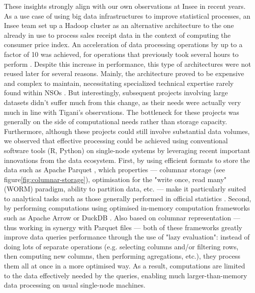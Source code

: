 These insights strongly align with our own observations at Insee in recent years. As a use case of using big data infrastructures to improve statistical processes, an Insee team set up a Hadoop cluster as an alternative architecture to the one already in use to process sales receipt data in the context of computing the consumer price index. An acceleration of data processing operations by up to a factor of 10 was achieved, for operations that previously took several hours to perform \cite{leclair2019utiliser}. Despite this increase in performance, this type of architectures were not reused later for several reasons. Mainly, the architecture proved to be expensive and complex to maintain, necessitating specialized technical expertise rarely found within NSOs \cite{vale2015international}. But interestingly, subsequent projects involving large datasets didn't suffer much from this change, as their needs were actually very much in line with Tigani's observations. The bottleneck for these projects was generally on the side of computational needs rather than storage capacity. Furthermore, although these projects could still involve substantial data volumes, we observed that effective processing could be achieved using conventional software tools (R, Python) on single-node systems by leveraging recent important innovations from the data ecosystem. First, by using efficient formats to store the data such as Apache Parquet \cite{parquet2013}, which properties — columnar storage \cite{abadi2013design} (see figure\ref{fig:columnar-storage}), optimisation for the "write once, read many" (WORM) paradigm, ability to partition data, etc. — make it particularly suited to analytical tasks such as those generally performed in official statistics \cite{abdelaziz2023optimizing}. Second, by performing computations using optimised in-memory computation frameworks such as Apache Arrow \cite{arrow2016} or DuckDB \cite{raasveldt2019duckdb}. Also based on columnar representation — thus working in synergy with Parquet files — both of these frameworks greatly improve data queries performance through the use of "lazy evaluation": instead of doing lots of separate operations (e.g. selecting columns and/or filtering rows, then computing new columns, then performing agregations, etc.), they process them all at once in a more optimised way. As a result, computations are limited to the data effectively needed by the queries, enabling much larger-than-memory data processing on usual single-node machines.

